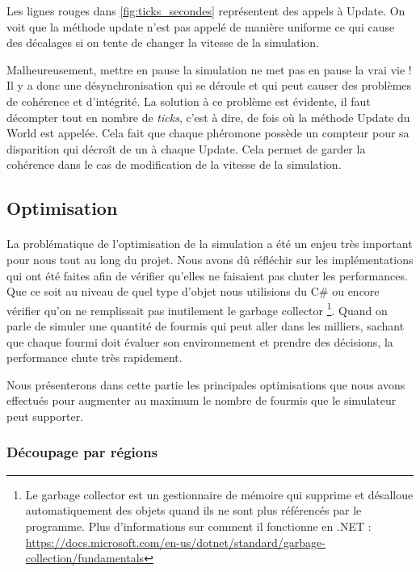 \documentclass{EPUProjetDi}
\begin{document}
Les lignes rouges dans \ref{fig:ticks_secondes} représentent des appels à Update. On voit que la méthode update n'est pas appelé de manière uniforme ce qui cause des décalages si on tente de changer la vitesse de la simulation.

Malheureusement, mettre en pause la simulation ne met pas en pause la vrai vie ! Il y a donc une désynchronisation qui se déroule et qui peut causer des problèmes de cohérence et d'intégrité.
La solution à ce problème est évidente, il faut décompter tout en nombre de \textit{ticks}, c'est à dire, de fois où la méthode Update du World est appelée. 
Cela fait que chaque phéromone possède un compteur pour sa disparition qui décroît de un à chaque Update. Cela permet de garder la cohérence dans le cas de modification de la vitesse de la simulation.

\subsection{Optimisation}

\paragraph{}
La problématique de l'optimisation de la simulation a été un enjeu très important pour nous tout au long du projet. Nous avons dû réfléchir sur les implémentations qui ont été faites afin de vérifier qu'elles ne 
faisaient pas chuter les performances. Que ce soit au niveau de quel type d'objet nous utilisions du C\# ou encore vérifier qu'on ne remplissait pas inutilement le garbage collector 
\footnote{Le garbage collector est un gestionnaire de mémoire qui supprime et désalloue automatiquement des objets quand ils ne sont plus référencés par le programme. 
Plus d'informations sur comment il fonctionne en .NET : \url{https://docs.microsoft.com/en-us/dotnet/standard/garbage-collection/fundamentals}}.
Quand on parle de simuler une quantité de fourmis qui peut aller dans les milliers, sachant que chaque fourmi doit évaluer son environnement et prendre des décisions, la performance chute très rapidement.

Nous présenterons dans cette partie les principales optimisations que nous avons effectués pour augmenter au maximum le nombre de fourmis que le simulateur peut supporter.

\subsubsection{Découpage par régions}
\end{document}
